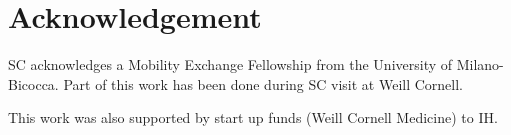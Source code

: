 \documentclass[a4paper,USenglish]{article}
\theoremstyle{definition}
\begin{document}
\section*{Acknowledgement}
SC acknowledges a Mobility Exchange Fellowship from the University of Milano-Bicocca. Part of this work has been done during SC visit at Weill Cornell.


This work was also supported by start up funds (Weill Cornell Medicine) to IH.

% 
%
%
%
% 
%


\end{document}
